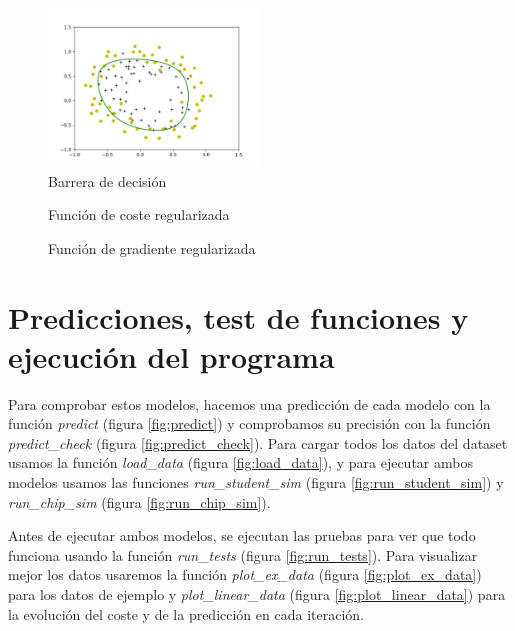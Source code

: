 \documentclass[6pt]{../../shared/AiTex}
\begin{document}
\begin{figure}[H]
    \centering
    \includegraphics[width=0.5\textwidth]{./imagenes/muestreo2_sim.png}
    \caption{Barrera de decisión}
    \label{fig:decision_boundary2}
\end{figure}

\begin{figure}[H]
    \centering
    
    \caption{Función de coste regularizada}
    \label{fig:cost_reg}
\end{figure}

\begin{figure}[H]
    \centering
    
    \caption{Función de gradiente regularizada}
    \label{fig:grad_reg}
\end{figure}

\section{Predicciones, test de funciones y ejecución del programa}

Para comprobar estos modelos, hacemos una predicción de cada modelo con la función \textit{predict} (figura \ref{fig:predict}) y comprobamos su precisión con la función \textit{predict\_check} (figura \ref{fig:predict_check}). Para cargar todos los datos del dataset usamos la función \textit{load\_data} (figura \ref{fig:load_data}), y para ejecutar ambos modelos usamos las funciones \textit{run\_student\_sim} (figura \ref{fig:run_student_sim}) y \textit{run\_chip\_sim} (figura \ref{fig:run_chip_sim}).

Antes de ejecutar ambos modelos, se ejecutan las pruebas para ver que todo funciona usando la función \textit{run\_tests} (figura \ref{fig:run_tests}). Para visualizar mejor los datos usaremos la función \textit{plot\_ex\_data} (figura \ref{fig:plot_ex_data}) para los datos de ejemplo y \textit{plot\_linear\_data} (figura \ref{fig:plot_linear_data}) para la evolución del coste y de la predicción en cada iteración.
\end{document}
